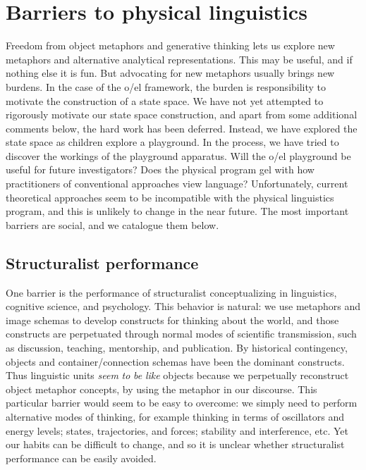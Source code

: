\section{Barriers to physical linguistics}

Freedom from object metaphors and generative thinking lets us explore new metaphors and alternative analytical representations. This may be useful, and if nothing else it is fun. But advocating for new metaphors usually brings new burdens. In the case of the o/el framework, the burden is responsibility to motivate the construction of a state space. We have not yet attempted to rigorously motivate our state space construction, and apart from some additional comments below, the hard work has been deferred. Instead, we have explored the state space as children explore a playground. In the process, we have tried to discover the workings of the playground apparatus. Will the o/el playground be useful for future investigators? Does the physical program gel with how practitioners of conventional approaches view language? Unfortunately, current theoretical approaches seem to be incompatible with the physical linguistics program, and this is unlikely to change in the near future. The most important barriers are social, and we catalogue them below.

\subsection{Structuralist performance}

One barrier is the performance of structuralist conceptualizing in linguistics, cognitive science, and psychology. This behavior is natural: we use metaphors and image schemas to develop constructs for thinking about the world, and those constructs are perpetuated through normal modes of scientific transmission, such as discussion, teaching, mentorship, and publication. By historical contingency, objects and container/connection schemas have been the dominant constructs. Thus linguistic units \textit{seem} \textit{to} \textit{be} \textit{like} objects because we perpetually reconstruct object metaphor concepts, by using the metaphor in our discourse. This particular barrier would seem to be easy to overcome: we simply need to perform alternative modes of thinking, for example thinking in terms of oscillators and energy levels; states, trajectories, and forces; stability and interference, etc. Yet our habits can be difficult to change, and so it is unclear whether structuralist performance can be easily avoided.

